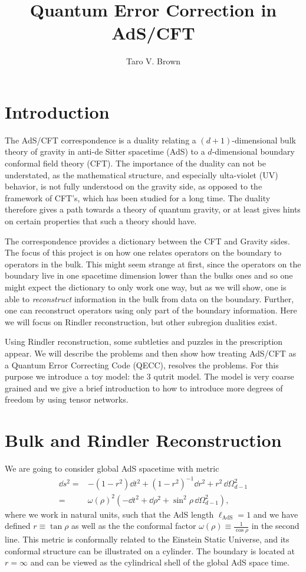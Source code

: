 \documentclass[letter,12pt]{article}
\title{Quantum Error Correction in AdS/CFT}
\author[a]{Taro V. Brown}
\affiliation[a]{Department of Physics, UC Davis, One Shields Avenue, Davis, CA 95616, USA }
\begin{document}
 
\maketitle
\flushbottom
\newpage
\section{Introduction}
The AdS/CFT correspondence is a duality relating a
$(d+1)$-dimensional bulk theory of gravity in anti-de Sitter spacetime (AdS) to a $d$-dimensional boundary conformal field theory (CFT). The importance of the duality can not be understated, as the mathematical structure, and especially ulta-violet (UV) behavior, is not fully understood on the gravity side, as opposed to the framework of CFT's, which has been studied for a long time. The duality therefore gives a path towards a theory of quantum gravity, or at least gives hints on certain properties that such a theory should have.

The correspondence provides a dictionary between the CFT and Gravity sides. The focus of this project is on how one relates operators on the boundary to operators in the bulk. This might seem strange at first, since the operators on the boundary live in one spacetime dimension lower than the bulks ones and so one might expect the dictionary to only work one way, but as we will show, one is able to \textit{reconstruct} information in the bulk from data on the boundary. Further, one can reconstruct operators using only part of the boundary information. Here we will focus on Rindler reconstruction, but other subregion dualities exist. 

Using Rindler reconstruction, some subtleties and puzzles in the prescription appear. We will describe the problems and then show how treating AdS/CFT as a Quantum Error Correcting Code (QECC), resolves the problems. For this purpose we introduce a toy model: the 3 qutrit model. The model is very coarse grained and we give a brief introduction to how to introduce more degrees of freedom by using tensor networks.
\section{Bulk and Rindler Reconstruction}
We are going to consider global AdS spacetime with metric
\begin{equation}
	\begin{aligned}
		\dd s^2=&-\left(1-r^2\right)\dd t^2+\left(1-r^2\right)^{-1}\dd r^2+r^2\,\dd\Omega_{d-1}^2
		\\
		=&\omega(\rho)^2\left(-\dd t^2+\dd \rho^2+\sin^2\rho\,\dd\Omega_{d-1}^2 \right),
	\end{aligned}
\end{equation}
where we work in natural units, such that the AdS length $\ell_{\text{AdS}}=1$ and we have defined $r\equiv \tan\rho $ as well as the the conformal factor $\omega(\rho)\equiv \frac{1}{\cos\rho}$ in the second line. This metric is conformally related to the Einstein Static Universe, and its conformal structure can be illustrated on a cylinder. The boundary is located at $r=\infty$ and can be viewed as the cylindrical shell of the global AdS space time.
\end{document}
